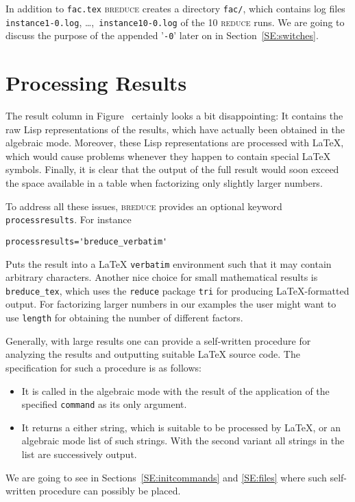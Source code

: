 \documentclass[a4paper]{article}
\begin{document}
In addition to \texttt{fac.tex} \textsc{breduce} creates a directory
\texttt{fac/}, which contains log files \texttt{instance1-0.log},
\dots,~\texttt{instance10-0.log} of the 10 \textsc{reduce} runs. We
are going to discuss the purpose of the appended '\texttt{-0}' later
on in Section~\ref{SE:switches}.

\section{Processing Results}\label{SE:processresults}
The result column in Figure~\label{FI:fac1} certainly looks a bit
disappointing: It contains the raw Lisp representations of the
results, which have actually been obtained in the algebraic mode.
Moreover, these Lisp representations are processed with \LaTeX, which
would cause problems whenever they happen to contain special \LaTeX{}
symbols. Finally, it is clear that the output of the full result would
soon exceed the space available in a table when factorizing only
slightly larger numbers.

To address all these issues, \textsc{breduce} provides an optional
keyword \texttt{process\-results}. For instance
\begin{verbatim}
processresults='breduce_verbatim'
\end{verbatim}
Puts the result into a \LaTeX{} \texttt{verbatim} environment such
that it may contain arbitrary characters. Another nice choice for
small mathematical results is \texttt{breduce\_tex}, which uses the
\texttt{reduce} package \texttt{tri} \cite{ASW:89} for producing
\LaTeX{}-formatted output. For factorizing larger numbers in our
examples the user might want to use \texttt{length} for obtaining the
number of different factors.

Generally, with large results one can provide a self-written procedure
for analyzing the results and outputting suitable \LaTeX{} source
code. The specification for such a procedure is as follows:
\begin{itemize}
\item It is called in the algebraic mode with the result of the
  application of the specified \texttt{command} as its only argument.
\item It returns a either string, which is suitable to be processed by
  \LaTeX{}, or an algebraic mode list of such strings. With the second
  variant all strings in the list are successively output.
\end{itemize}
We are going to see in Sections~\ref{SE:initcommands} and
\ref{SE:files} where such self-written procedure can possibly be
placed.
\end{document}
